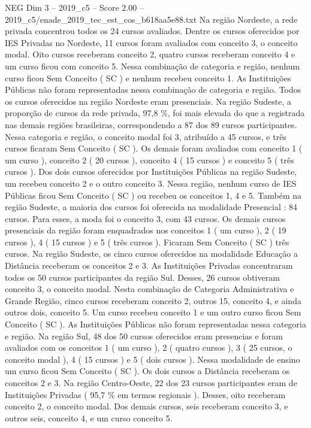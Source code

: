 \begin{textsample}{NEG Dim 3 – 2019\_c5 – Score 2.00 – 2019\_c5/enade\_2019\_tec\_est\_cos\_b618aa5e88.txt}
Na região Nordeste, a rede privada concentrou todos os 24 cursos avaliados.
Dentre os cursos oferecidos por IES Privadas no Nordeste, 11 cursos foram avaliados com conceito 3, o conceito modal.
Oito cursos receberam conceito 2, quatro cursos receberam conceito 4 e um curso ficou com conceito 5.
Nessa combinação de categoria e região, nenhum curso ficou Sem Conceito ( SC ) e nenhum recebeu conceito 1.
As Instituições Públicas não foram representadas nessa combinação de categoria e região.
Todos os cursos oferecidos na região Nordeste eram presenciais.
Na região Sudeste, a proporção de cursos da rede privada, 97,8 \%, foi mais elevada do que a registrada nas demais regiões brasileiras, correspondendo a 87 dos 89 cursos participantes.
Nessa categoria e região, o conceito modal foi 3, atribuído a 45 cursos, e três cursos ficaram Sem Conceito ( SC ).
Os demais foram avaliados com conceito 1 ( um curso ), conceito 2 ( 20 cursos ), conceito 4 ( 15 cursos ) e conceito 5 ( três cursos ).
Dos dois cursos oferecidos por Instituições Públicas na região Sudeste, um recebeu conceito 2 e o outro conceito 3.
Nessa região, nenhum curso de IES Públicas ficou Sem Conceito ( SC ) ou recebeu os conceitos 1, 4 e 5.
Também na região Sudeste, a maioria dos cursos foi oferecida na modalidade Presencial : 84 cursos.
Para esses, a moda foi o conceito 3, com 43 cursos.
Os demais cursos presenciais da região foram enquadrados nos conceitos 1 ( um curso ), 2 ( 19 cursos ), 4 ( 15 cursos ) e 5 ( três cursos ).
Ficaram Sem Conceito ( SC ) três cursos.
Na região Sudeste, os cinco cursos oferecidos na modalidade Educação a Distância receberam os conceitos 2 e 3.
As Instituições Privadas concentraram todos os 50 cursos participantes da região Sul.
Desses, 26 cursos obtiveram conceito 3, o conceito modal.
Nesta combinação de Categoria Administrativa e Grande Região, cinco cursos receberam conceito 2, outros 15, conceito 4, e ainda outros dois, conceito 5.
Um curso recebeu conceito 1 e um outro curso ficou Sem Conceito ( SC ).
As Instituições Públicas não foram representadas nessa categoria e região.
Na região Sul, 48 dos 50 cursos oferecidos eram presencias e foram avaliados com os conceitos 1 ( um curso ), 2 ( quatro cursos ), 3 ( 25 cursos, o conceito modal ), 4 ( 15 cursos ) e 5 ( dois cursos ).
Nessa modalidade de ensino um curso ficou Sem Conceito ( SC ).
Os dois cursos a Distância receberam os conceitos 2 e 3.
Na região Centro-Oeste, 22 dos 23 cursos participantes eram de Instituições Privadas ( 95,7 \% em termos regionais ).
Desses, oito receberam conceito 2, o conceito modal.
Dos demais cursos, seis receberam conceito 3, e outros seis, conceito 4, e um curso conceito 5.

\end{textsample}
